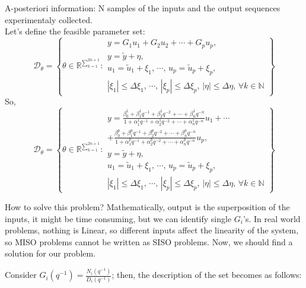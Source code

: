 A-posteriori information: N samples of the inputs and the output sequences experimentaly collected. \\
Let's define the feasible parameter set:
\[
\mathcal{D}_\theta= \left\{ \theta \in \mathbb{R}^{\sum_{k=1}^{2n+1}} : 
\begin{array}{l}
y = G_1 u_1 + G_2 u_2 + \cdots + G_p u_p, \\
y = \tilde{y} + \eta, \\
u_1 = \tilde{u}_1 + \xi_1, \, \cdots, \, u_p = \tilde{u}_p + \xi_p, \\
|\xi_1| \leq \Delta \xi_1, \, \cdots, \, |\xi_p| \leq \Delta \xi_p, \, |\eta| \leq \Delta \eta, \, \forall k \in \mathbb{N}
\end{array}
\right\}
\]
So,
\[
\mathcal{D}_\theta = \left\{ \theta \in \mathbb{R}^{\sum_{k=1}^{2n+1}} : 
\begin{array}{l}
y = \frac{\beta_0^1 + \beta_1^1 q^{-1} + \beta_2^1 q^{-2} + \cdots + \beta_n^1 q^{-n}}{1 + \alpha_1^1 q^{-1} + \alpha_2^1 q^{-2} + \cdots + \alpha_n^1 q^{-n}} u_1 + \cdots \\[2ex]+ \frac{\beta_0^p + \beta_1^p q^{-1} + \beta_2^p q^{-2} + \cdots + \beta_n^p q^{-n}}{1 + \alpha_1^p q^{-1} + \alpha_2^p q^{-2} + \cdots + \alpha_n^p q^{-n}} u_p, \\
y = \tilde{y} + \eta, \\
u_1 = \tilde{u}_1 + \xi_1, \, \cdots, \, u_p = \tilde{u}_p + \xi_p, \\
|\xi_1| \leq \Delta \xi_1, \, \cdots, \, |\xi_p| \leq \Delta \xi_p, \, |\eta| \leq \Delta \eta, \, \forall k \in \mathbb{N}
\end{array}
\right\}
\]

How to solve this problem? Mathematically, output is the superposition of the inputs, it might be time consuming, but we can identify single $G_i$'s. In real world problems, nothing is Linear, so different inputs affect the linearity of the system, so MISO problems cannot be written as SISO problems. Now, we should find a solution for our problem.

Consider $G_i(q^{-1}) = \frac{N_i(q^{-1})}{D_i(q^{-1})}$; then, the description of the set becomes as follows:

